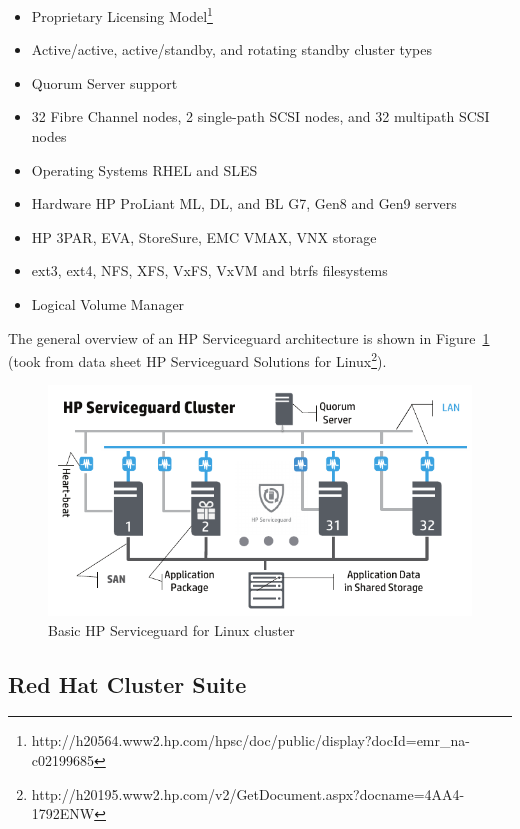 \documentclass[a4paper, 12pt]{book}
\begin{document}
\begin{itemize}
	\item Proprietary Licensing Model\footnote{http://h20564.www2.hp.com/hpsc/doc/public/display?docId=emr\_na-c02199685}
	\item Active/active, active/standby, and rotating standby cluster types
	\item Quorum Server support
	\item 32 Fibre Channel nodes, 2 single-path SCSI nodes, and 32 multipath SCSI nodes
	\item Operating Systems RHEL and SLES
	\item Hardware HP ProLiant ML, DL, and BL G7, Gen8 and Gen9 servers
	\item HP 3PAR, EVA, StoreSure, EMC VMAX, VNX storage
	\item ext3, ext4, NFS, XFS, VxFS, VxVM and btrfs filesystems
	\item Logical Volume Manager
\end{itemize}

\noindent The general overview of an HP Serviceguard architecture is shown in Figure~\ref{fig:serviceguard} (took from data sheet HP Serviceguard Solutions for Linux\footnote{http://h20195.www2.hp.com/v2/GetDocument.aspx?docname=4AA4-1792ENW}).

\begin{figure}
  \centering
  \includegraphics[scale=0.70]{hp-serviceguard.png}
  \caption[Basic HP Serviceguard for Linux cluster]{Basic HP Serviceguard for Linux cluster}
  \label{fig:serviceguard}
\end{figure}


\subsection{Red Hat Cluster Suite}
\label{subsec:rhcs}
\end{document}
